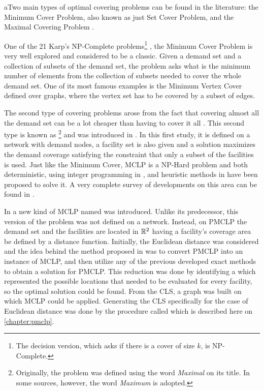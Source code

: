 aTwo main types of optimal covering problems can be found in the literature: the Minimum Cover Problem, also known as just Set Cover Problem, and the Maximal Covering Problem \cite{karatas}. 

One of the 21 Karp's NP-Complete problems\footnote{The decision version, which asks if there is a cover of size $k$, is NP-Complete.} \cite{karp}, the Minimum Cover Problem is very well explored and considered to be a classic. 
Given a demand set and a collection of subsets of the demand set, the problem asks what is the minimum number of elements from the collection of subsets needed to cover the whole demand set. One of its most famous examples is the Minimum Vertex Cover defined over graphs, where the vertex set has to be covered by a subset of edges.

The second type of covering problems arose from the fact that covering almost all the demand set can be a lot cheaper than having to cover it all \cite{garcia}. This second type is known as \footnote{Originally, the problem was defined using the word \textit{Maximal} on its title. In some sources, however, the word \textit{Maximum} is adopted.} and was introduced in . In this first study, it is defined on a network with demand nodes, a facility set is also given and a solution maximizes the demand coverage satisfying the constraint that only a subset of the facilities is used. Just like the Minimum Cover, MCLP is a NP-Hard problem \cite{hatta:2013} and both deterministic, using integer programming in , and heuristic methods in  have been proposed to solve it. A very complete survey of developments on this area can be found in .

In  a new kind of MCLP named  was introduced. Unlike its predecessor, this version of the problem was not defined on a network. Instead, on PMCLP the demand set and the facilities are located in $\mathbb{R}^2$ having a facility's coverage area be defined by a distance function. 
Initially, the Euclidean distance was considered and the idea behind the method proposed in  was to convert PMCLP into an instance of MCLP, and then utilize any of the previous developed exact methods to obtain a solution for PMCLP. This reduction was done by identifying a  which represented the possible locations that needed to be evaluated for every facility, so the optimal solution could be found. From the CLS, a graph was built on which MCLP could be applied. Generating the CLS specifically for the case of Euclidean distance was done by the procedure called  which is described here on \autoref{chapter:pmclp}.

